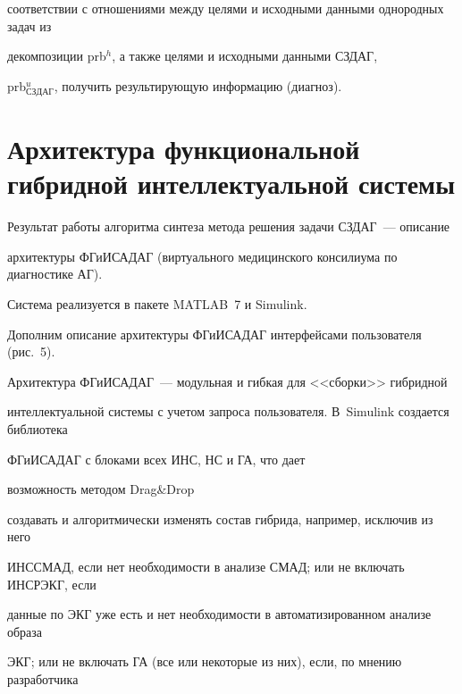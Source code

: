 соответствии с отношениями между целями и исходными данными однородных задач из


декомпозиции prb$^h$, а также целями и исходными данными СЗДАГ,


prb$^u_{\mathrm{СЗДАГ}}$, получить результирующую информацию (диагноз).





\section{Архитектура функциональной гибридной интеллектуальной системы}





 Результат работы алгоритма синтеза метода решения задачи СЗДАГ~--- описание


архитектуры ФГиИСАДАГ (виртуального медицинского консилиума по диагностике АГ).


Система реализуется в пакете MATLAB~7 и Simulink.





 Дополним описание архитектуры ФГиИСАДАГ интерфейсами пользователя (рис.~5).


Архитектура ФГиИСАДАГ~--- модульная и гибкая для <<сборки>> гиб\-рид\-ной


интеллектуальной системы с учетом запроса пользователя. В~Simulink создается библиотека


ФГиИСАДАГ с блоками всех ИНС, НС и ГА, что дает\linebreak


\vspace*{-12pt} 





\pagebreak





\noindent


возможность методом Drag\&Drop


создавать и алгоритмически изменять состав гибрида, например, исключив из него


ИНССМАД, если нет необходимости в анализе СМАД; или не включать ИНСРЭКГ, если


данные по ЭКГ уже есть и нет необходимости в автоматизированном анализе образа


ЭКГ; или не включать ГА (все или некоторые из них), если, по мнению разработчика


